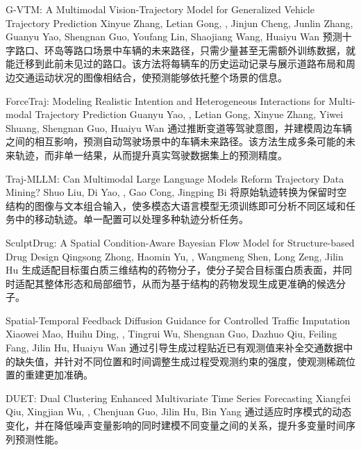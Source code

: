 {G-VTM: A Multimodal Vision-Trajectory Model for Generalized Vehicle Trajectory Prediction}
{Xinyue Zhang, Letian Gong, \me, Jinjun Cheng, Junlin Zhang, Guanyu Yao, Shengnan Guo, Youfang Lin, Shaojiang Wang, Huaiyu Wan}
{预测十字路口、环岛等路口场景中车辆的未来路径，只需少量甚至无需额外训练数据，就能迁移到此前未见过的路口。该方法将每辆车的历史运动记录与展示道路布局和周边交通运动状况的图像相结合，使预测能够依托整个场景的信息。}

{ForceTraj: Modeling Realistic Intention and Heterogeneous Interactions for Multi-modal Trajectory Prediction}
{Guanyu Yao, \me, Letian Gong, Xinyue Zhang, Yiwei Shuang, Shengnan Guo, Huaiyu Wan}
{通过推断变道等驾驶意图，并建模周边车辆之间的相互影响，预测自动驾驶场景中的车辆未来路径。该方法生成多条可能的未来轨迹，而非单一结果，从而提升真实驾驶数据集上的预测精度。}

{Traj-MLLM: Can Multimodal Large Language Models Reform Trajectory Data Mining?}
{Shuo Liu, Di Yao, \me, Gao Cong, Jingping Bi}
{将原始轨迹转换为保留时空结构的图像与文本组合输入，使多模态大语言模型无须训练即可分析不同区域和任务中的移动轨迹。单一配置可以处理多种轨迹分析任务。}

{SculptDrug: A Spatial Condition-Aware Bayesian Flow Model for Structure-based Drug Design}
{Qingsong Zhong, Haomin Yu, \me, Wangmeng Shen, Long Zeng, Jilin Hu}
{生成适配目标蛋白质三维结构的药物分子，使分子契合目标蛋白质表面，并同时适配其整体形态和局部细节，从而为基于结构的药物发现生成更准确的候选分子。}

{Spatial-Temporal Feedback Diffusion Guidance for Controlled Traffic Imputation}
{Xiaowei Mao, Huihu Ding, \me, Tingrui Wu, Shengnan Guo, Dazhuo Qiu, Feiling Fang, Jilin Hu, Huaiyu Wan}
{通过引导生成过程贴近已有观测值来补全交通数据中的缺失值，并针对不同位置和时间调整生成过程受观测约束的强度，使观测稀疏位置的重建更加准确。}

{DUET: Dual Clustering Enhanced Multivariate Time Series Forecasting}
{Xiangfei Qiu, Xingjian Wu, \me, Chenjuan Guo, Jilin Hu, Bin Yang}
{通过适应时序模式的动态变化，并在降低噪声变量影响的同时建模不同变量之间的关系，提升多变量时间序列预测性能。}

